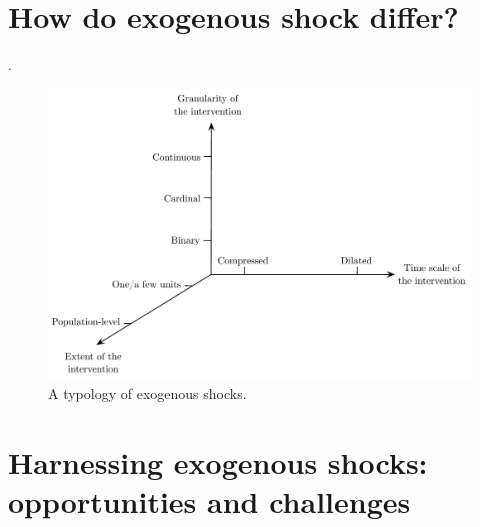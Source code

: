 \begin{refsection}
\clearpage

\section{How do exogenous shock differ?}
\label{sec:how_exogenous_shocks_differ}

.

\begin{figure}[!htbp]
    \begin{center}
      \includegraphics[width=1\textwidth]{exhibits/typology.pdf}
    \end{center}
    \caption{A typology of exogenous shocks.}
    \label{fig:typology}
\end{figure}


\section{Harnessing exogenous shocks: opportunities and challenges}
\label{sec:harnessing_exogenous_shocks}


\end{refsection}
